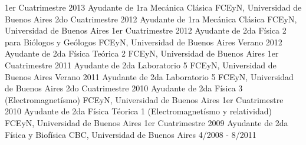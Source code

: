 \begin{cventries}
    {1er Cuatrimestre 2013} %
    {
    }
    \vspace{-.4cm}
  \cventry
    {Ayudante de 1ra} %
    {Mecánica Clásica} %
    {FCEyN, Universidad de Buenos Aires} %
    {2do Cuatrimestre 2012} %
    {
    }
    \vspace{-.4cm}
  \cventry
    {Ayudante de 1ra} %
    {Mecánica Clásica} %
    {FCEyN, Universidad de Buenos Aires} %
    {1er Cuatrimestre 2012} %
    {
    }
    \vspace{-.4cm}
  \cventry
    {Ayudante de 2da} %
    {Física 2 para Biólogos y Geólogos} %
    {FCEyN, Universidad de Buenos Aires} %
    {Verano 2012} %
    {
    }
    \vspace{-.4cm}
  \cventry
    {Ayudante de 2da} %
    {Física Teórica 2} %
    {FCEyN, Universidad de Buenos Aires} %
    {1er Cuatrimestre 2011} %
    {
    }
    \vspace{-.4cm}
  \cventry
    {Ayudante de 2da} %
    {Laboratorio 5} %
    {FCEyN, Universidad de Buenos Aires} %
    {Verano 2011} %
    {
    }
    \vspace{-.4cm}
  \cventry
    {Ayudante de 2da} %
    {Laboratorio 5} %
    {FCEyN, Universidad de Buenos Aires} %
    {2do Cuatrimestre 2010} %
    {
    }
    \vspace{-.4cm}
  \cventry
    {Ayudante de 2da} %
    {Física 3 (Electromagnetísmo)} %
    {FCEyN, Universidad de Buenos Aires} %
    {1er Cuatrimestre 2010} %
    {
    }
    \vspace{-.4cm}
  \cventry
    {Ayudante de 2da} %
    {Física Téorica 1 (Electromagnetísmo y relatividad)} %
    {FCEyN, Universidad de Buenos Aires} %
    {1er Cuatrimestre 2009} %
    {
    }
    \vspace{-.4cm}
  \cventry
    {Ayudante de 2da} %
    {Física y Biofísica} %
    {CBC, Universidad de Buenos Aires} %
    {4/2008 - 8/2011} %
    {
    }

\end{cventries}

